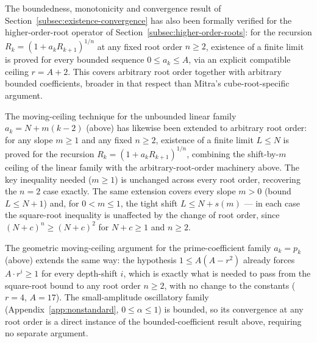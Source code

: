 \documentclass[11pt,a4paper]{amsart}
\theoremstyle{plain}
\theoremstyle{definition}
\theoremstyle{remark}
\begin{document}
The boundedness, monotonicity and convergence result of Section~\ref{subsec:existence-convergence} has also been formally verified for the higher-order-root operator of Section~\ref{subsec:higher-order-roots}: for the recursion $R_k=(1+a_k R_{k+1})^{1/n}$ at any fixed root order $n \ge 2$, existence of a finite limit is proved for every bounded sequence $0 \le a_k \le A$, via an explicit compatible ceiling $r=A+2$. This covers arbitrary root order together with arbitrary bounded coefficients, broader in that respect than Mitra's cube-root-specific argument.

The moving-ceiling technique for the unbounded linear family $a_k=N+m(k-2)$ (above) has likewise been extended to arbitrary root order: for any slope $m \ge 1$ and any fixed $n \ge 2$, existence of a finite limit $L \le N$ is proved for the recursion $R_k=(1+a_k R_{k+1})^{1/n}$, combining the shift-by-$m$ ceiling of the linear family with the arbitrary-root-order machinery above. The key inequality needed ($m \ge 1$) is unchanged across every root order, recovering the $n=2$ case exactly. The same extension covers every slope $m>0$ (bound $L\le N+1$) and, for $0<m\le 1$, the tight shift $L\le N+s(m)$ — in each case the square-root inequality is unaffected by the change of root order, since $(N+c)^n\ge (N+c)^2$ for $N+c\ge 1$ and $n\ge 2$.

The geometric moving-ceiling argument for the prime-coefficient family $a_k=p_k$ (above) extends the same way: the hypothesis $1\le A(A-r^2)$ already forces $A\cdot r^i\ge 1$ for every depth-shift $i$, which is exactly what is needed to pass from the square-root bound to any root order $n\ge 2$, with no change to the constants ($r=4$, $A=17$). The small-amplitude oscillatory family (Appendix~\ref{app:nonstandard}, $0\le\alpha\le 1$) is bounded, so its convergence at any root order is a direct instance of the bounded-coefficient result above, requiring no separate argument.
\end{document}
